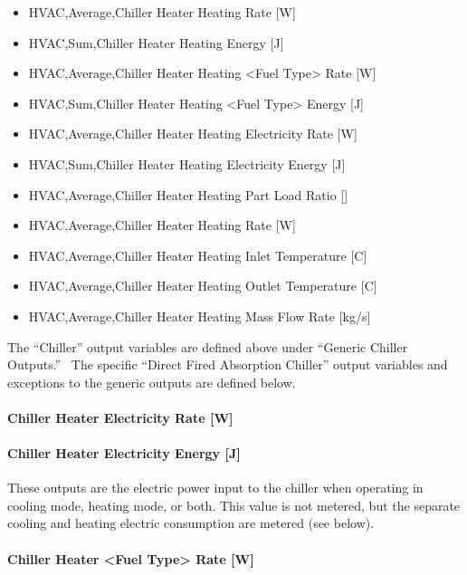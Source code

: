 \begin{itemize}
    \item
    HVAC,Average,Chiller Heater Heating Rate {[}W{]}
    \item
    HVAC,Sum,Chiller Heater Heating Energy {[}J{]}
    \item
    HVAC,Average,Chiller Heater Heating \textless{}Fuel Type\textgreater{} Rate {[}W{]}
    \item
    HVAC,Sum,Chiller Heater Heating \textless{}Fuel Type\textgreater{} Energy {[}J{]}
    \item
    HVAC,Average,Chiller Heater Heating Electricity Rate {[}W{]}
    \item
    HVAC,Sum,Chiller Heater Heating Electricity Energy {[}J{]}
    \item
    HVAC,Average,Chiller Heater Heating Part Load Ratio {[]}
    \item
    HVAC,Average,Chiller Heater Heating Rate {[}W{]}
    \item
    HVAC,Average,Chiller Heater Heating Inlet Temperature {[}C{]}
    \item
    HVAC,Average,Chiller Heater Heating Outlet Temperature {[}C{]}
    \item
    HVAC,Average,Chiller Heater Heating Mass Flow Rate {[}kg/s{]}
\end{itemize}

The ``Chiller'' output variables are defined above under ``Generic Chiller Outputs.''~ The specific ``Direct Fired Absorption Chiller'' output variables and exceptions to the generic outputs are defined below.

\paragraph{Chiller Heater Electricity Rate {[}W{]}}\label{chiller-heater-electric-power-w}

\paragraph{Chiller Heater Electricity Energy {[}J{]}}\label{chiller-heater-electric-energy-j}

These outputs are the electric power input to the chiller when operating in cooling mode, heating mode, or both. This value is not metered, but the separate cooling and heating electric consumption are metered (see below).

\paragraph{Chiller Heater \textless{}Fuel Type\textgreater{} Rate {[}W{]}}\label{chiller-heater-fuel-type-rate-w}

